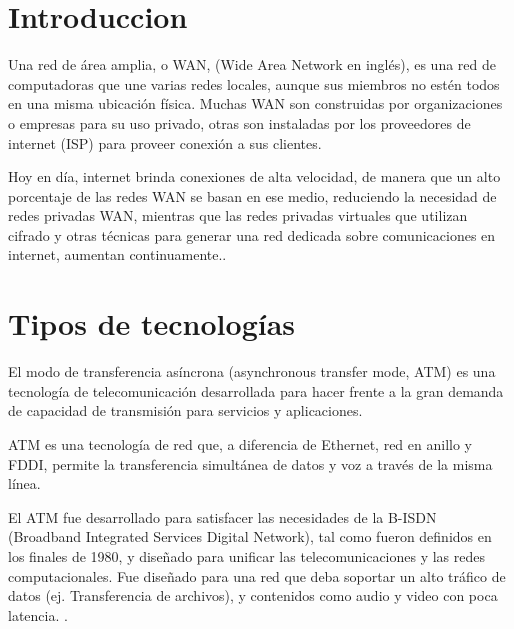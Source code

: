 \documentclass[a4paper,openright,12pt]{report}
\begin{document}
\begin{titlepage}
\begin{large}
\chapter{Introduccion}
\begin{flushleft}
Una red de área amplia, o WAN, (Wide Area Network en inglés), es una red de computadoras que une varias redes locales, aunque sus miembros no estén todos en una misma ubicación física. Muchas WAN son construidas por organizaciones o empresas para su uso privado, otras son instaladas por los proveedores de internet (ISP) para proveer conexión a sus clientes.

Hoy en día, internet brinda conexiones de alta velocidad, de manera que un alto porcentaje de las redes WAN se basan en ese medio, reduciendo la necesidad de redes privadas WAN, mientras que las redes privadas virtuales que utilizan cifrado y otras técnicas para generar una red dedicada sobre comunicaciones en internet, aumentan continuamente..\\
\end{flushleft}


\chapter{Tipos de tecnologías}\label{cap.nudo}
\begin{flushleft}
El modo de transferencia asíncrona (asynchronous transfer mode, ATM) es una tecnología de telecomunicación desarrollada para hacer frente a la gran demanda de capacidad de transmisión para servicios y aplicaciones.

ATM es una tecnología de red que, a diferencia de Ethernet, red en anillo y FDDI, permite la transferencia simultánea de datos y voz a través de la misma línea.

El ATM fue desarrollado para satisfacer las necesidades de la B-ISDN (Broadband Integrated Services Digital Network), tal como fueron definidos en los finales de 1980, y diseñado para unificar las telecomunicaciones y las redes computacionales. Fue diseñado para una red que deba soportar un alto tráfico de datos (ej. Transferencia de archivos), y contenidos como audio y video con poca latencia.
.
\\

\vspace*{0.6in}

\begin{center}
\end{center}
\end{flushleft}


\end{large}
\end{titlepage}
\end{document}
